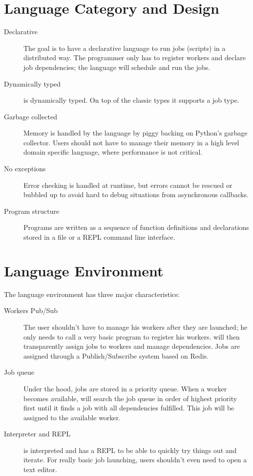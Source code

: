 \section{Language Category and Design}
\label{sect:desg}
\begin{description}
\item[Declarative] The goal is to have a declarative language to run jobs
(scripts) in a distributed way. The programmer only has to register workers and
declare job dependencies; the language will schedule and run the jobs.
\item[Dynamically typed] \lang{} is dynamically typed.
On top of the classic types it supports a job type.
\item[Garbage collected] Memory is handled by the language by piggy backing on
Python's garbage collector. Users should not have to manage their memory in a high
level domain specific language, where performance is not critical.
\item[No exceptions] Error checking is handled at runtime, but errors cannot be rescued
or bubbled up to avoid hard to debug situations from asynchronous callbacks.
\item[Program structure] Programs are written as a sequence of function
definitions and declarations stored in a file or a REPL command line
interface.
\end{description}

\section{Language Environment}
\label{sect:tech}
The language environment has three major characteristics:
\begin{description}
\item[Workers Pub/Sub] The user shouldn't have to manage his workers after
they are launched; he only needs to call a very basic program
to register his workers. \lang{} will then transparently assign jobs to workers
and manage dependencies. Jobs are assigned through a Publish/Subscribe system
based on Redis.
\item[Job queue] Under the hood, jobs are stored in a priority queue. When a
worker becomes available, \lang{} will search the job queue in order of highest
priority first until it finds a job with all dependencies fulfilled. This job
will be assigned to the available worker.
\item[Interpreter and REPL] \lang{} is interpreted and has a REPL to be able to
quickly try things out and iterate. For really basic job launching, users shouldn't
even need to open a text editor.
\end{description}

